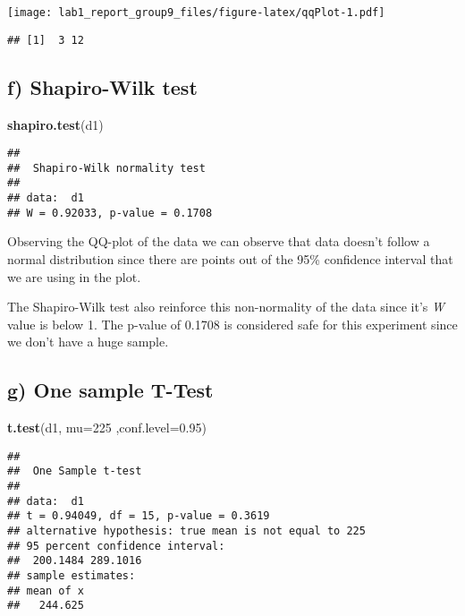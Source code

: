 \documentclass[
]{article}
\newenvironment{Shaded}{\begin{snugshade}}{\end{snugshade}}
\newcommand{\DataTypeTok}[1]{\textcolor[rgb]{0.13,0.29,0.53}{#1}}
\newcommand{\DecValTok}[1]{\textcolor[rgb]{0.00,0.00,0.81}{#1}}
\newcommand{\FloatTok}[1]{\textcolor[rgb]{0.00,0.00,0.81}{#1}}
\newcommand{\KeywordTok}[1]{\textcolor[rgb]{0.13,0.29,0.53}{\textbf{#1}}}
\newcommand{\NormalTok}[1]{#1}
\begin{document}
\texttt{[image: lab1\_report\_group9\_files/figure-latex/qqPlot-1.pdf]}

\begin{verbatim}
## [1]  3 12
\end{verbatim}

\hypertarget{f-shapiro-wilk-test}{%
\subsection{f) Shapiro-Wilk test}\label{f-shapiro-wilk-test}}

\begin{Shaded}
\begin{Highlighting}[]
\KeywordTok{shapiro.test}\NormalTok{(d1)}
\end{Highlighting}
\end{Shaded}

\begin{verbatim}
## 
##  Shapiro-Wilk normality test
## 
## data:  d1
## W = 0.92033, p-value = 0.1708
\end{verbatim}

Observing the QQ-plot of the data we can observe that data doesn't
follow a normal distribution since there are points out of the 95\%
confidence interval that we are using in the plot.

The Shapiro-Wilk test also reinforce this non-normality of the data
since it's \emph{W} value is below 1. The p-value of 0.1708 is
considered safe for this experiment since we don't have a huge sample.

\hypertarget{g-one-sample-t-test}{%
\subsection{g) One sample T-Test}\label{g-one-sample-t-test}}

\begin{Shaded}
\begin{Highlighting}[]
\KeywordTok{t.test}\NormalTok{(d1, }\DataTypeTok{mu=}\DecValTok{225}\NormalTok{ ,}\DataTypeTok{conf.level=}\FloatTok{0.95}\NormalTok{)}
\end{Highlighting}
\end{Shaded}

\begin{verbatim}
## 
##  One Sample t-test
## 
## data:  d1
## t = 0.94049, df = 15, p-value = 0.3619
## alternative hypothesis: true mean is not equal to 225
## 95 percent confidence interval:
##  200.1484 289.1016
## sample estimates:
## mean of x 
##   244.625
\end{verbatim}
\end{document}
